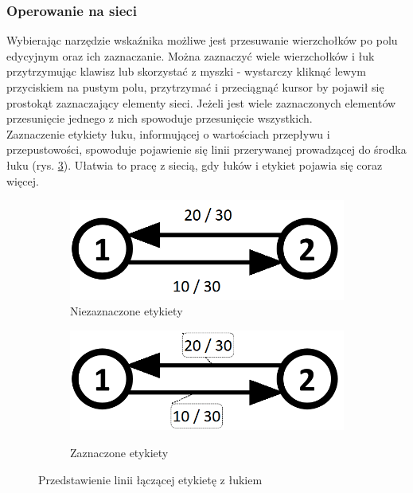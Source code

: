 \subsubsection{Operowanie na sieci}
Wybierając narzędzie wskaźnika możliwe jest przesuwanie wierzchołków po polu edycyjnym oraz ich zaznaczanie. Można zaznaczyć wiele wierzchołków i łuk przytrzymując klawisz \keys{\ctrl} lub skorzystać z myszki - wystarczy kliknąć lewym przyciskiem na pustym polu, przytrzymać i przeciągnąć kursor by pojawił się prostokąt zaznaczający elementy sieci. Jeżeli jest wiele zaznaczonych elementów przesunięcie jednego z nich spowoduje przesunięcie wszystkich.\\\indent
Zaznaczenie etykiety łuku, informującej o wartościach przepływu i przepustowości, spowoduje pojawienie się linii przerywanej prowadzącej do środka łuku (rys. \ref{fig:grafSelect}). Ułatwia to pracę z siecią, gdy łuków i etykiet pojawia się coraz więcej.
\begin{figure}[H]
	\centering
	\begin{subfigure}{0.45\textwidth}
		\includegraphics[width=0.9\linewidth]{./img/spec_zew05_1.png}
		\caption{Niezaznaczone etykiety}
		\label{fig:grafSelect1}
	\end{subfigure}
	\begin{subfigure}{0.45\textwidth}
		\includegraphics[width=0.9\linewidth]{./img/spec_zew05_2.png}
		\label{fig:grafSelect2}
		\caption{Zaznaczone etykiety}
	\end{subfigure}
	\caption{Przedstawienie linii łączącej etykietę z łukiem}
	\label{fig:grafSelect}
\end{figure}

